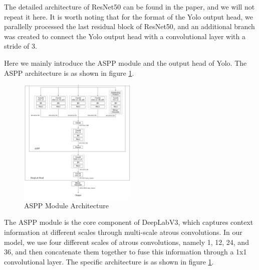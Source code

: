 \documentclass[conference]{IEEEtran}
\begin{document}

The detailed architecture of ResNet50 can be found in the paper, and we will not repeat it here. It is worth noting that for the format of the Yolo output head, we parallelly processed the last residual block of ResNet50, and an additional branch was created to connect the Yolo output head with a convolutional layer with a stride of 3.

Here we mainly introduce the ASPP module and the output head of Yolo. The ASPP architecture is as shown in figure \ref{fig:aspp}.

\begin{figure}[htbp]
    \centering
    \centerline{\includegraphics[width=0.5\textwidth]{fig/aspp.png}}
    \caption{ASPP Module Architecture}
    \label{fig:aspp}
\end{figure}


The ASPP module is the core component of DeepLabV3, which captures context information at different scales through multi-scale atrous convolutions. In our model, we use four different scales of atrous convolutions, namely 1, 12, 24, and 36, and then concatenate them together to fuse this information through a 1x1 convolutional layer. The specific architecture is as shown in figure \ref{fig:aspp}.
\end{document}
